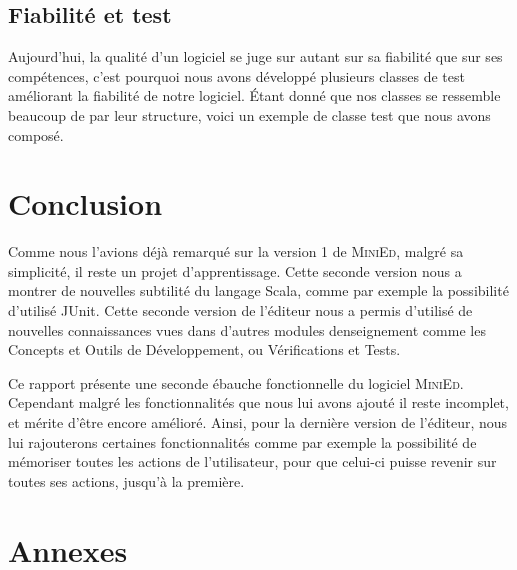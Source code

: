 \documentclass[a4paper, 12pt]{report}
\begin{document}
		\section*{Fiabilité et test}

		Aujourd'hui, la qualité d'un logiciel se juge sur autant sur sa fiabilité que sur ses compétences, c'est pourquoi nous avons développé plusieurs classes de test améliorant la fiabilité de notre logiciel. \'Etant donné que nos classes se ressemble beaucoup de par leur structure, voici un exemple de classe test que nous avons composé.

		\vspace{0.5cm}
		

	\newpage
	
	\chapter*{Conclusion}
	
		Comme nous l'avions déjà remarqué sur la version 1 de \textsc{MiniEd}, malgré sa simplicité, il reste un projet d'apprentissage. Cette seconde version nous a montrer de nouvelles subtilité du langage Scala, comme par exemple la possibilité d'utilisé JUnit. Cette seconde version de l'éditeur nous a permis d'utilisé de nouvelles connaissances vues dans d'autres modules denseignement comme les Concepts et Outils de Développement, ou Vérifications et Tests.

		\vspace{0.5cm}

	Ce rapport présente une seconde ébauche fonctionnelle du logiciel \textsc{MiniEd}. Cependant malgré les fonctionnalités que nous lui avons ajouté il reste incomplet, et mérite d'être encore amélioré. Ainsi, pour la dernière version de l'éditeur, nous lui rajouterons certaines fonctionnalités comme par exemple la possibilité de mémoriser toutes les actions de l'utilisateur, pour que celui-ci puisse revenir sur toutes ses actions, jusqu'à la première.

    \chapter*{Annexes}
    
\end{document}
